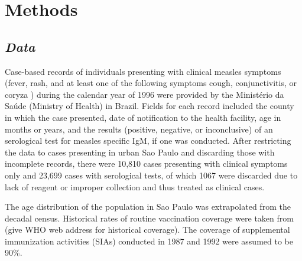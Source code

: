 \section{\texorpdfstring{\textbf{Methods}}{Methods}}\label{methods}

\subsection{\texorpdfstring{\emph{Data}}{Data}}\label{data}

Case-based records of individuals presenting with clinical measles
symptoms (fever, rash, and at least one of the following symptoms cough,
conjunctivitis, or coryza \cite{Hutchins_2004}) during the calendar year of 1996 were
provided by the Ministério da Saúde (Ministry of Health) in Brazil. Fields for each
record included the county in which the case presented, date of
notification to the health facility, age in months or years, and the
results (positive, negative, or inconclusive) of an serological test for
measles specific IgM, if one was conducted. After restricting the data to cases
presenting in urban Sao Paulo and discarding those with incomplete
records, there were 10,810 cases presenting with clinical symptoms only
and 23,699 cases with serological tests, of which 1067 were discarded
due to lack of reagent or improper collection and thus treated as
clinical cases.

The age distribution of the population in Sao Paulo was extrapolated
from the decadal census. Historical rates of routine vaccination
coverage were taken from (give WHO web address for historical coverage).
The coverage of supplemental immunization activities (SIAs) conducted in
1987 and 1992 were assumed to be 90\%.